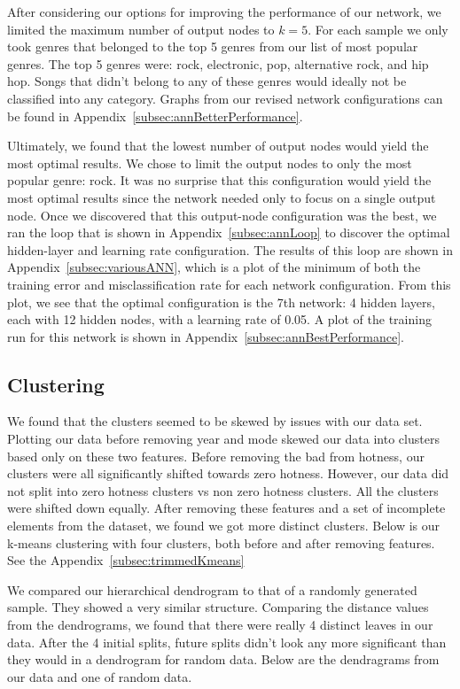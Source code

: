 \documentclass[12pt]{article}
\begin{document}
After considering our options for improving the performance of our network, we limited the maximum number of output nodes to $k = 5$. For each sample we only took genres that belonged to the top 5 genres from our list of most popular genres. The top 5 genres were: rock, electronic, pop, alternative rock, and hip hop. Songs that didn't belong to any of these genres would ideally not be classified into any category. Graphs from our revised network configurations can be found in Appendix~\ref{subsec:annBetterPerformance}.

Ultimately, we found that the lowest number of output nodes would yield the most optimal results. We chose to limit the output nodes to only the most popular genre: rock. It was no surprise that this configuration would yield the most optimal results since the network needed only to focus on a single output node. Once we discovered that this output-node configuration was the best, we ran the loop that is shown in Appendix~\ref{subsec:annLoop} to discover the optimal hidden-layer and learning rate configuration. The results of this loop are shown in Appendix~\ref{subsec:variousANN}, which is a plot of the minimum of both the training error and misclassification rate for each network configuration. From this plot, we see that the optimal configuration is the 7th network: 4 hidden layers, each with 12 hidden nodes, with a learning rate of 0.05. A plot of the training run for this network is shown in Appendix~\ref{subsec:annBestPerformance}.


\subsection{Clustering}
\label{subsec:clusteringResults}
We found that the clusters seemed to be skewed by issues with our data set. Plotting our data before removing year and mode skewed our data into clusters based only on these two features. Before removing the bad from hotness, our clusters were all significantly shifted towards zero hotness. However, our data did not split into zero hotness clusters vs non zero hotness clusters. All the clusters were shifted down equally. After removing these features and a set of incomplete elements from the dataset, we found we got more distinct clusters. Below is our k-means clustering with four clusters, both before and after removing features.
See the Appendix~\ref{subsec:trimmedKmeans}

We compared our hierarchical dendrogram to that of a randomly generated sample. They showed a very similar structure. Comparing the distance values from the dendrograms, we found that there were really 4 distinct leaves in our data. After the 4 initial splits, future splits didn't look any more significant than they would in a dendrogram for random data. Below are the dendragrams from our data and one of random data.
\end{document}
